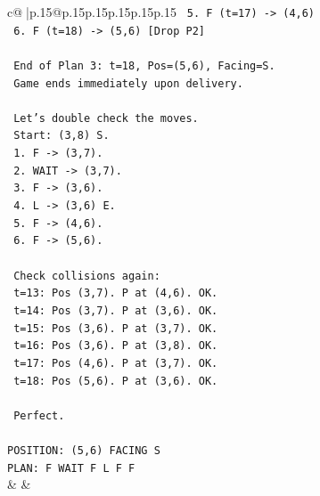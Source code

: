 \documentclass{article}
\begin{document}
{\begin{supertabular}{c@{$\;$}|p{.15\linewidth}@{}p{.15\linewidth}p{.15\linewidth}p{.15\linewidth}p{.15\linewidth}p{.15\linewidth}}
{{{\texttt{     5. F (t=17) {-}> (4,6)} \\
\texttt{     6. F (t=18) {-}> (5,6) {[}Drop P2{]}} \\
\\ 
\texttt{     End of Plan 3: t=18, Pos=(5,6), Facing=S.} \\
\texttt{     Game ends immediately upon delivery.} \\
\\ 
\texttt{     Let's double check the moves.} \\
\texttt{     Start: (3,8) S.} \\
\texttt{     1. F {-}> (3,7).} \\
\texttt{     2. WAIT {-}> (3,7).} \\
\texttt{     3. F {-}> (3,6).} \\
\texttt{     4. L {-}> (3,6) E.} \\
\texttt{     5. F {-}> (4,6).} \\
\texttt{     6. F {-}> (5,6).} \\
\\ 
\texttt{     Check collisions again:} \\
\texttt{     t=13: Pos (3,7). P at (4,6). OK.} \\
\texttt{     t=14: Pos (3,7). P at (3,6). OK.} \\
\texttt{     t=15: Pos (3,6). P at (3,7). OK.} \\
\texttt{     t=16: Pos (3,6). P at (3,8). OK.} \\
\texttt{     t=17: Pos (4,6). P at (3,7). OK.} \\
\texttt{     t=18: Pos (5,6). P at (3,6). OK.} \\
\\ 
\texttt{     Perfect.} \\
\\ 
\texttt{POSITION: (5,6) FACING S} \\
\texttt{PLAN: F WAIT F L F F} \\
            }
        }
    }
    & & \\ \\


\end{supertabular}}
\end{document}

